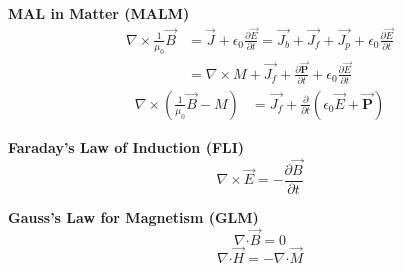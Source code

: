 \documentclass[12pt]{article}
\newcommand*{\dotP}{\boldsymbol \cdot}		%
\begin{document}
\begin{minipage}[t]{0.35\textwidth}
	\textbf{MAL in Matter (MALM)}
	\begin{align*}
		\nabla \times \frac{1}{\mu_0} \vec{B} &= \vec{J} + \epsilon_0 \frac{\partial \vec{E}}{\partial t}
			= \vec{J_b} + \vec{J_f} + \vec{J_p} + \epsilon_0 \frac{\partial \vec{E}}{\partial t} \\
		&= \nabla \times M + \vec{J_f} + \frac{\partial \vec{ \mathbf{P} }}{\partial t} 
			+ \epsilon_0 \frac{\partial \vec{E}}{\partial t}
	\end{align*}
	\begin{align*}
		\nabla \times \left( \frac{1}{\mu_0} \vec{B} - M \right)
			&= \vec{J_f} + \frac{\partial}{\partial t} \left( \epsilon_0 \vec{E} + \vec{ \mathbf{P} } \right)
	\end{align*}

	\vspace{10pt}
\end{minipage}

\vspace{20pt}
\begin{center}
\begin{minipage}[t]{0.35\textwidth}
	\textbf{Faraday's Law of Induction (FLI)}
	\[ \boxed{ \nabla \times \vec{E} = -\frac{\partial \vec{B}}{\partial t} } \]
	\hfill \break 
\end{minipage} 
\hspace{0.15\textwidth} 
\begin{minipage}[t]{0.35\textwidth}
	\textbf{Gauss's Law for Magnetism (GLM)}
	\[ \boxed{ \nabla \dotP \vec{B} = 0 } \]
	\[ \boxed{ \nabla \dotP \vec{H} = - \nabla \dotP \vec{M} } \]
\end{minipage} 
\end{center}
\end{document}

